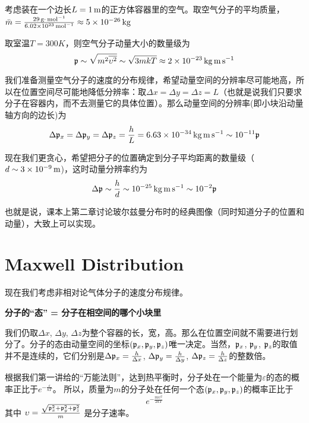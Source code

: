 \documentclass[CJK]{beamer}
\begin{document}
\begin{frame}
\bch
考虑装在一个边长$L= 1\,\mathrm{m}$的正方体容器里的空气。取空气分子的平均质量，$\bar{m} = \frac{29\,\mathrm{g}\cdot\,\mathrm{mol}^{-1}}{6.02\times 10^{23}\,\mathrm{mol}^{-1}}\approx 5 \times 10^{-26}\,\mathrm{kg}$

取室温$T=300K$，则空气分子动量大小的数量级为
$${\mathfrak{p}} \sim \sqrt{m^2\overline{\upsilon^2}} \sim \sqrt{3mkT} \approx 2\times 10^{-23} \,\mathrm{kg} \,\mathrm{m}\,\mathrm{s}^{-1} $$

我们准备测量空气分子的速度的分布规律，希望动量空间的分辨率尽可能地高，所以在位置空间尽可能地降低分辨率：取$\Delta x=\Delta y=\Delta z = L$（也就是说我们只要求分子在容器内，而不去测量它的具体位置）。那么动量空间的分辨率(即小块沿动量轴方向的边长)为
$$\Delta {\mathfrak{p}}_x = \Delta {\mathfrak{p}}_y = \Delta {\mathfrak{p}}_z= \frac{h}{L} = 6.63\times 10^{-34} \,\mathrm{kg}\,\mathrm{m}\,\mathrm{s}^{-1} \sim 10^{-11} {\mathfrak{p}}$$

\ech
\end{frame}


\begin{frame}
\bch
现在我们更贪心，希望把分子的位置确定到分子平均距离的数量级（$d\sim 3\times 10^{-9}\,\mathrm{m}$)，这时动量分辨率约为
$$\Delta {\mathfrak{p}} \sim \frac{h}{d} \sim 10^{-25} \,\mathrm{kg}\,\mathrm{m}\,\mathrm{s}^{-1} \sim 10^{-2} {\mathfrak{p}}$$

也就是说，课本上第二章讨论玻尔兹曼分布时的经典图像（同时知道分子的位置和动量），大致上可以实现。

\ech
\end{frame}


\section{Maxwell Distribution}

\begin{frame}
\bch
现在我们考虑非相对论气体分子的速度分布规律。

\skipline

{\blue \bf 分子的“态” = 分子在相空间的哪个小块里 }

\skipline

我们仍取$\Delta x$, $\Delta y$, $\Delta z$为整个容器的长，宽，高。那么在位置空间就不需要进行划分了。分子的态由动量空间的坐标$({\mathfrak{p}}_x, {\mathfrak{p}}_y, {\mathfrak{p}}_z)$唯一决定。当然，${\mathfrak{p}}_x$, ${\mathfrak{p}}_y$, ${\mathfrak{p}}_z$的取值并不是连续的，它们分别是$\Delta {\mathfrak{p}}_x=\frac{h}{\Delta x}$, $\Delta {\mathfrak{p}}_y=\frac{h}{\Delta y}$, $\Delta {\mathfrak{p}}_z=\frac{h}{\Delta z}$的整数倍。

\skipline
根据我们第一讲给的“万能法则”，达到热平衡时，分子处在一个能量为$\varepsilon$的态的概率正比于$e^{-\frac{\varepsilon}{kT}}$。
所以，质量为$m$的分子处在任何一个态$({\mathfrak{p}}_x, {\mathfrak{p}}_y, {\mathfrak{p}}_z)$的概率正比于
$$e^{-\frac{m\upsilon^2}{2kT}}$$
其中
$\upsilon = \frac{\sqrt{{\mathfrak{p}}_x^2 +{\mathfrak{p}}_y^2+ {\mathfrak{p}}_z^2}}{m}$
是分子速率。
\ech
\end{frame}
\end{document}

